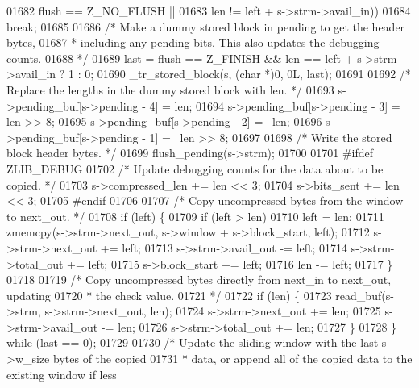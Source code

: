 \begin{DoxyCode}
{{{{{01682                                 flush == Z\_NO\_FLUSH ||
01683                                 len != left + s->strm->avail\_in))
01684             \textcolor{keywordflow}{break};
01685 
01686         \textcolor{comment}{/* Make a dummy stored block in pending to get the header bytes,}
01687 \textcolor{comment}{         * including any pending bits. This also updates the debugging counts.}
01688 \textcolor{comment}{         */}
01689         last = flush == Z\_FINISH && len == left + s->strm->avail\_in ? 1 : 0;
01690         \_tr\_stored\_block(s, (\textcolor{keywordtype}{char} *)0, 0L, last);
01691 
01692         \textcolor{comment}{/* Replace the lengths in the dummy stored block with len. */}
01693         s->pending\_buf[s->pending - 4] = len;
01694         s->pending\_buf[s->pending - 3] = len >> 8;
01695         s->pending\_buf[s->pending - 2] = ~len;
01696         s->pending\_buf[s->pending - 1] = ~len >> 8;
01697 
01698         \textcolor{comment}{/* Write the stored block header bytes. */}
01699         flush\_pending(s->strm);
01700 
01701 \textcolor{preprocessor}{#ifdef ZLIB\_DEBUG}
01702         \textcolor{comment}{/* Update debugging counts for the data about to be copied. */}
01703         s->compressed\_len += len << 3;
01704         s->bits\_sent += len << 3;
01705 \textcolor{preprocessor}{#endif}
01706 
01707         \textcolor{comment}{/* Copy uncompressed bytes from the window to next\_out. */}
01708         \textcolor{keywordflow}{if} (left) \{
01709             \textcolor{keywordflow}{if} (left > len)
01710                 left = len;
01711             zmemcpy(s->strm->next\_out, s->window + s->block\_start, left);
01712             s->strm->next\_out += left;
01713             s->strm->avail\_out -= left;
01714             s->strm->total\_out += left;
01715             s->block\_start += left;
01716             len -= left;
01717         \}
01718 
01719         \textcolor{comment}{/* Copy uncompressed bytes directly from next\_in to next\_out, updating}
01720 \textcolor{comment}{         * the check value.}
01721 \textcolor{comment}{         */}
01722         \textcolor{keywordflow}{if} (len) \{
01723             read\_buf(s->strm, s->strm->next\_out, len);
01724             s->strm->next\_out += len;
01725             s->strm->avail\_out -= len;
01726             s->strm->total\_out += len;
01727         \}
01728     \} \textcolor{keywordflow}{while} (last == 0);
01729 
01730     \textcolor{comment}{/* Update the sliding window with the last s->w\_size bytes of the copied}
01731 \textcolor{comment}{     * data, or append all of the copied data to the existing window if less}
}}}}}
\end{DoxyCode}
